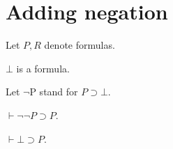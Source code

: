 \documentclass{article}
\newcommand{\imp}{\supset}
\newcommand{\deducible}{\vdash}
\newcommand{\falsum}{\bot}
\newcommand{\negate}{\lnot}
\begin{document}
\section{Adding negation}

\begin{forthel}
Let $P, R$ denote formulas.

\begin{signature}[id=Falsum]
    $\falsum$ is a formula.
\end{signature}

Let $\negate$P stand for $P\imp\falsum$.

\begin{axiom}[id=Double negation]
    $\deducible\negate\negate P\imp P$.
\end{axiom}

\begin{proposition}[id=Explosion]
    $\deducible \falsum\imp P$.
\end{proposition}

\end{forthel}
\end{document}
